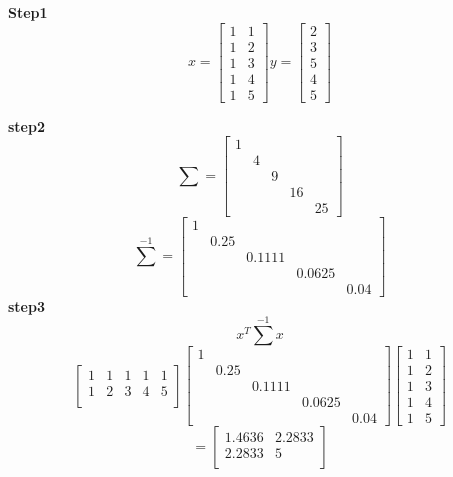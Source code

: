 \documentclass{article}
\begin{document}
\textbf{Step1} 
\[x=\begin{bmatrix}
    1 & 1 \\
    1 & 2 \\
    1 & 3 \\
    1 & 4 \\
    1 & 5
\end{bmatrix}
y=\begin{bmatrix}
    2 \\
    3 \\
    5 \\
    4 \\
    5
\end{bmatrix}\]

\textbf{step2}
\[\sum=\begin{bmatrix}
    1 & & & & \\
    & 4 & & & \\
    & & 9 & & \\
    & & & 16 & \\
    & & & & 25
\end{bmatrix}\]
\[\sum^{-1}=\begin{bmatrix}
    1 & & & & \\
    & 0.25 & & & \\
    & & 0.1111 & & \\
    & & & 0.0625 & \\
    & & & & 0.04
\end{bmatrix}\]
\textbf{step3}
\[x^T\sum^{-1}x\]
\[\begin{bmatrix}
    1 & 1 & 1 & 1 & 1 \\
    1 & 2 & 3 & 4 & 5 \\
\end{bmatrix}
\begin{bmatrix}
    1 & & & & \\
    & 0.25 & & & \\
    & & 0.1111 & & \\
    & & & 0.0625 & \\
    & & & & 0.04
\end{bmatrix}
\begin{bmatrix}
    1 & 1 \\
    1 & 2 \\
    1 & 3 \\
    1 & 4 \\
    1 & 5
\end{bmatrix}\]
\[=\begin{bmatrix}
    1.4636 & 2.2833 \\
    2.2833 & 5 \\
\end{bmatrix}\]
\end{document}
